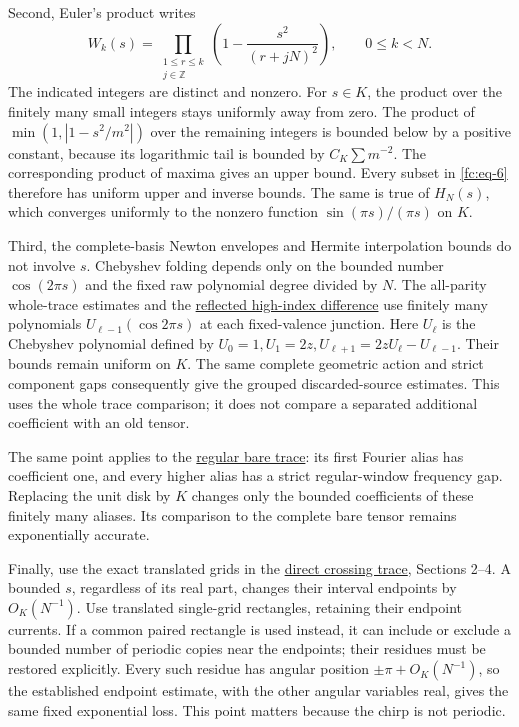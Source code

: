 Second, Euler's product writes
\begin{equation}\label{fc:eq-6}
W_k(s)=\prod_{\substack{1\le r\le k\\j\in\mathbb Z}}
             \left(1-\frac{s^2}{(r+jN)^2}\right),
       \qquad 0\le k<N.
\end{equation}
 The indicated integers are distinct and nonzero. For \(s\in K\), the product over the finitely many small integers stays uniformly away from zero. The product of \(\min(1,|1-s^2/m^2|)\) over the remaining integers is bounded below by a positive constant, because its logarithmic tail is bounded by \(C_K\sum m^{-2}\). The corresponding product of maxima gives an upper bound. Every subset in \eqref{fc:eq-6} therefore has uniform upper and inverse bounds. The same is true of \(H_N(s)\), which converges uniformly to the nonzero function \(\sin(\pi s)/(\pi s)\) on \(K\).

Third, the complete-basis Newton envelopes and Hermite interpolation bounds do not involve \(s\). Chebyshev folding depends only on the bounded number \(\cos(2\pi s)\) and the fixed raw polynomial degree divided by \(N\). The all-parity whole-trace estimates and the \href{https://sashakolpakov.github.io/murakamis_dream/notes/actual_main_meridian_high_fourier_reflection.html}{reflected high-index difference} use finitely many polynomials \(U_{\ell-1}(\cos2\pi s)\) at each fixed-valence junction. Here \(U_\ell\) is the Chebyshev polynomial defined by \(U_0=1,U_1=2z,U_{\ell+1}=2zU_\ell-U_{\ell-1}\). Their bounds remain uniform on \(K\). The same complete geometric action and strict component gaps consequently give the grouped discarded-source estimates. This uses the whole trace comparison; it does not compare a separated additional coefficient with an old tensor.

The same point applies to the \href{https://sashakolpakov.github.io/murakamis_dream/notes/actual_main_meridian_regular_bare_trace.html}{regular bare trace}: its first Fourier alias has coefficient one, and every higher alias has a strict regular-window frequency gap. Replacing the unit disk by \(K\) changes only the bounded coefficients of these finitely many aliases. Its comparison to the complete bare tensor remains exponentially accurate.

Finally, use the exact translated grids in the \href{https://sashakolpakov.github.io/murakamis_dream/notes/actual_main_meridian_direct_crossing_trace.html}{direct crossing trace}, Sections 2--4. A bounded \(s\), regardless of its real part, changes their interval endpoints by \(O_K(N^{-1})\). Use translated single-grid rectangles, retaining their endpoint currents. If a common paired rectangle is used instead, it can include or exclude a bounded number of periodic copies near the endpoints; their residues must be restored explicitly. Every such residue has angular position \(\pm\pi+O_K(N^{-1})\), so the established endpoint estimate, with the other angular variables real, gives the same fixed exponential loss. This point matters because the chirp is not periodic.

